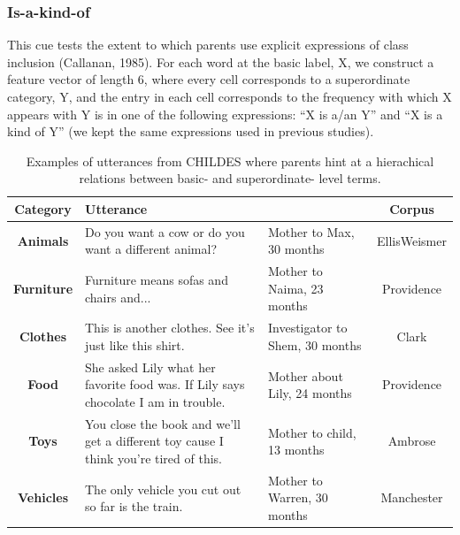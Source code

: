 \documentclass[english,,man,floatsintext]{apa6}
\begin{document}
\hypertarget{is-a-kind-of}{%
\subsubsection{Is-a-kind-of}\label{is-a-kind-of}}

This cue tests the extent to which parents use explicit expressions of class inclusion (Callanan, 1985). For each word at the basic label, X,
we construct a feature vector of length 6, where every cell corresponds to a superordinate category, Y, and the entry in each cell corresponds to the frequency with which X appears with Y is in one of the following expressions: \enquote{X is a/an Y} and \enquote{X is a kind of Y} (we kept the same expressions used in previous studies).

\begin{table}[!htbp] \centering 
\begin{tabularx}{\linewidth}{cXXc}
\hline
\textbf{Category} & Utterance & & Corpus\\
\hline

\textbf{Animals} & Do you want a cow or do you want a different animal? & Mother to Max, 30 months & EllisWeismer\\

\textbf{Furniture} & Furniture means sofas and chairs and... & Mother to Naima, 23 months & Providence\\

\textbf{Clothes} & This is another clothes. See it's just like this shirt. & Investigator to Shem, 30 months & Clark\\

\textbf{Food} & She asked Lily what her favorite food was. If Lily says chocolate I am in trouble. & Mother about Lily, 24 months & Providence\\

\textbf{Toys} & You close the book and we'll get a different toy cause I think you're tired of this. & Mother to child, 13 months & Ambrose\\

\textbf{Vehicles} & The only vehicle you cut out so far is the train. & Mother to Warren, 30 months & Manchester\\

\hline
\end{tabularx}
\caption{\label{tab:pragmatic} Examples of utterances from CHILDES where parents hint at a hierachical relations between basic- and superordinate- level terms.}
\end{table}
\end{document}
